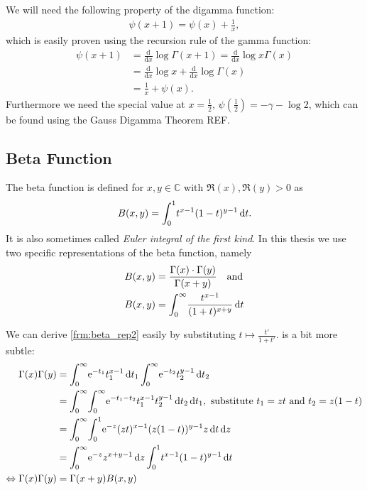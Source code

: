 We will need the following property of the digamma function:
\begin{align}
  \psi(x + 1) = \psi(x) + \frac1x,
\end{align}
which is easily proven using the recursion rule of the gamma function:
\begin{align*}
  \psi(x+1) &= \frac{\mathrm d}{\mathrm dx}\log{\Gamma(x+1)} = \frac{\mathrm
d}{\mathrm dx}\log{x\Gamma(x)} \\
  &= \frac{\mathrm d}{\mathrm dx}\log{x} + \frac{\mathrm d}{\mathrm
  dx}\log{\Gamma(x)} \\
  &= \frac1x + \psi(x).
\end{align*}
Furthermore we need the special value at $x = \frac12$, $\psi(\frac12) =
-\gamma-\log 2$, which can be found using the Gauss Digamma Theorem REF.

\subsection{Beta Function}
\label{sec:beta_function}
The beta function is defined for $x,y\in\mathbb{C}$ with $\Re(x),\Re(y) > 0$ as
\begin{align}
    B(x,y) = \Integ[1]{0}{t}{t^{x-1}(1-t)^{y-1}}.
    \label{def:beta}
\end{align}
It is also sometimes called \textit{Euler integral of the first kind}. In this
thesis we use two specific representations of the beta function, namely
\begin{align}
    B(x, y) &= \frac{\Gamma(x)\cdot\Gamma(y)}{\Gamma(x+y)} \quad \text{and}
    \label{frm:beta_rep1} \\
    B(x, y) &= \Integ[\infty]{0}{t}{\frac{t^{x-1}}{(1 + t)^{x+y}}}
    \label{frm:beta_rep2}
\end{align}

We can derive \cref{frm:beta_rep2} easily by substituting $t \mapsto
\frac{t'}{1+t'}$.  is a bit more subtle:
\begin{align*}
    \Gamma(x) \Gamma(y) &= \Integ[\infty]{0}{t_1}{\Eto{-t_1}t_1^{x-1}}
                           \Integ[\infty]{0}{t_2}{\Eto{-t_2}t_2^{y-1}} \\
    &= \Integ[\infty]{0}{t_1}{
        \Integ[\infty]{0}{t_2}{
            \Eto{-t_1-t_2}t_1^{x-1}t_2^{y-1}
            }
        },\text{ substitute $t_1 = zt$ and $t_2 = z(1-t)$} \\
    &= \Integ[\infty]{0}{z}{
        \Integ[1]{0}{t}{
            \Eto{-z}(zt)^{x-1}(z(1-t))^{y-1}z
            }
        } \\
        &= \Integ[\infty]{0}{z}{ \Eto{-z}z^{x+y-1} }
            \Integ[1]{0}{t}{t^{x-1}(1-t)^{y-1}} \\
    \Leftrightarrow \Gamma(x)\Gamma(y) &= \Gamma(x+y)B(x,y)
\end{align*}

